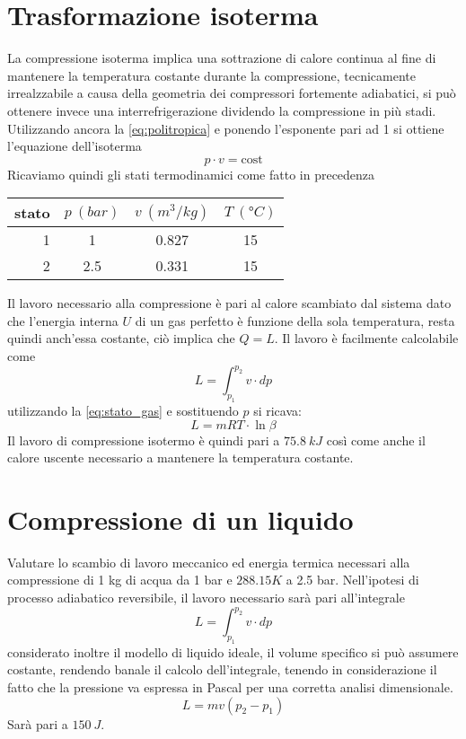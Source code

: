 \documentclass[a4paper,12pt]{article}
\begin{document}
\section{Trasformazione isoterma}
\label{sec:quarta_trasformazione}
La compressione isoterma implica una sottrazione di calore continua al fine di mantenere la temperatura
costante durante la compressione, tecnicamente irrealzzabile a causa della geometria dei compressori
fortemente adiabatici, si può ottenere invece una interrefrigerazione dividendo la compressione in più 
stadi.
Utilizzando ancora la \eqref{eq:politropica} e ponendo l'esponente pari ad 1 si ottiene l'equazione dell'isoterma
\begin{equation}
    p\cdot v = \text{cost}
\end{equation}
Ricaviamo quindi gli stati termodinamici come fatto in precedenza
\begin{center}
    \begin{tabular}{r|c|c|c}
        stato    & $p\ (bar)$ & $v\ (m^3/kg)$ & $T\ (\text{°}C) $\\ \hline
        1   &           1 &          0.827    &           15     \\ \hline
        2   &         2.5 &          0.331    &           15
    \end{tabular}
\end{center}
Il lavoro necessario alla compressione è pari al calore scambiato dal sistema dato che l'energia interna $U$
di un gas perfetto è funzione della sola temperatura, resta quindi anch'essa costante, ciò implica che
$Q = L$.
Il lavoro è facilmente calcolabile come 
\begin{equation}
    L = \int_{p_1}^{p_2} v\cdot dp
\end{equation}
utilizzando la \eqref{eq:stato_gas} e sostituendo $p$ si ricava:
\begin{equation}
    L = mRT\cdot \ln\beta
\end{equation}
Il lavoro di compressione isotermo è quindi pari a $75.8\ kJ$ così come anche il calore uscente necessario a 
mantenere la temperatura costante.

\section{Compressione di un liquido}
\label{sec:compressione_liquido}
Valutare lo scambio di lavoro meccanico ed energia termica necessari alla compressione di 1 kg di acqua da
1 bar e $288.15 K$ a 2.5 bar.
Nell'ipotesi di processo adiabatico reversibile, il lavoro necessario sarà pari all'integrale 
\begin{equation}
    L = \int_{p_1}^{p_2} v\cdot dp
\end{equation}
considerato inoltre il modello di liquido ideale, il volume specifico si può assumere costante, rendendo banale
il calcolo dell'integrale, tenendo in considerazione il fatto che la pressione va espressa in Pascal
per una corretta analisi dimensionale.
\begin{equation}
    L = mv(p_2-p_1)
\end{equation}
Sarà pari a $150\ J$.
\end{document}
